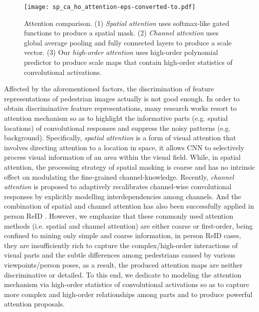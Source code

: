 \documentclass[10pt,twocolumn,letterpaper]{article}
\begin{document}
\begin{figure}
\vspace{-2em}
  \centering
\texttt{[image: sp\_ca\_ho\_attention-eps-converted-to.pdf]}\\
  \caption{Attention comparison. (1) \emph{Spatial attention} uses softmax-like gated functions to produce a spatial mask. (2) \emph{Channel attention} \cite{hu2018squeeze} uses global average pooling and fully connected layers to produce a scale vector. (3) Our \emph{high-order attention} uses high-order polynomial predictor to produce scale maps that contain high-order statistics of convolutional activations.}\label{fig_sp_ca_ho_attention}
  \vspace{-2em}
\end{figure}

Affected by the aforementioned factors, the discrimination of feature representations of pedestrian images actually is not good enough. In order to obtain discriminative feature representations, many research works \cite{liu2017hydraplus,li2018harmonious,li2018diversity,xu2018attention,kalayeh2018human,zhao2017spindle,varior2016gated} resort to attention mechanism so as to highlight the informative parts (e.g. spatial locations) of convolutional responses and suppress the noisy patterns (e.g. background). Specifically, \emph{spatial attention} \cite{li2018diversity,li2018harmonious,xu2018attention} is a form of visual attention that involves directing attention to a location in space, it allows CNN to selectively process visual information of an area within the visual field. While, in spatial attention, the processing strategy of spatial masking is coarse and has no intrinsic effect on modulating the fine-grained channel-knowledge. Recently, \emph{channel attention} \cite{chen2017sca,hu2018squeeze,li2018harmonious} is proposed to adaptively recalibrates channel-wise convolutional responses by explicitly modelling interdependencies among channels. And the combination of spatial and channel attention has also been successfully applied in person ReID \cite{li2018harmonious}. However, we emphasize that these commonly used attention methods (i.e. spatial and channel attention) are either coarse or first-order, being confined to mining only simple and coarse information, in person ReID cases, they are insufficiently rich to capture the complex/high-order interactions of visual parts and the subtle differences among pedestrians caused by various viewpoints/person poses, as a result, the produced attention maps are neither discriminative or detailed. To this end, we dedicate to modeling the attention mechanism via high-order statistics of convolutional activations so as to capture more complex and high-order relationships among parts and to produce powerful attention proposals.
\end{document}
